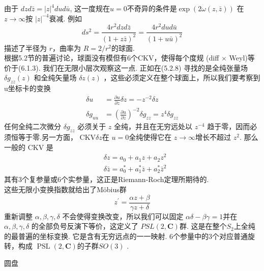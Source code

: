 由于 $d z d \bar{z}=|z|^{4} d u d \bar{u}$, 这一度规在$u=0$不奇异的条件是$\exp (2 \omega(z, \bar{z}))$ 在 $z \rightarrow \infty $按 $|z|^{-4}$衰减. 例如
\begin{equation}
	d s^{2}=\frac{4 r^{2} d z d \bar{z}}{(1+z \bar{z})^{2}}=\frac{4 r^{2} d u d \bar{u}}{(1+u \bar{u})^{2}}
\end{equation}
描述了半径为 $r$，曲率为 $R=2 / r^{2}$的球面.\\
根据5.2节的普遍讨论，球面没有模但有6个CKV，使得每个度规 (diff $\times$ Weyl)等价于(6.1.3). 我们在无限小层次观察这一点. 正如在(5.2.8) 寻找的是全纯张量场$\delta g_{z z}(z)$ 和全纯矢量场 $\delta z(z) $ ，这些必须定义在整个球面上，所以我们要考察到u坐标卡的变换
\begin{equation}
	\begin{aligned}
		\delta u &=\frac{\partial u}{\partial z} \delta z=-z^{-2} \delta z \\
		\delta g_{u u} &=\left(\frac{\partial u}{\partial z}\right)^{-2} \delta g_{z z}=z^{4} \delta g_{z z}
	\end{aligned}
\end{equation}
任何全纯二次微分 $\delta g_{z z}$ 必须关于 $z$ 全纯，并且在无穷远处以 $z^{-4}$ 趋于零，因而必须恒等于零.另一方面， $\mathrm{CKV} \delta z$在 $u=0$全纯使得它在 $z \rightarrow \infty$增长不超过 $z^{2}$. 那么一般的 $\mathrm{CKV}$ 是
\begin{equation}
	\begin{aligned}
		&\delta z=a_{0}+a_{1} z+a_{2} z^{2} \\
		&\delta \bar{z}=a_{0}^{*}+a_{1}^{*} \bar{z}+a_{2}^{*} \bar{z}^{2}
	\end{aligned}
\end{equation}
其有3个复参量或6个实参量，这正是Riemann-Roch定理所期待的.\\
这些无限小变换指数就给出了Möbius群
\begin{equation}
	z^{\prime}=\frac{\alpha z+\beta}{\gamma z+\delta}
\end{equation}
重新调整 $\alpha, \beta, \gamma, \delta $ 不会使得变换改变，所以我们可以固定 $\alpha \delta-\beta \gamma=1$并在 $\alpha, \beta, \gamma, \delta $ 的全部负号反演下等价，这定义了 $P S L(2, \mathbf{C})$群. 这是在整个$S_{2}$上全纯的最普遍的坐标变换. 它是含有无穷远点的一一映射. 6个参量中的3个对应普通旋转，构成 $\operatorname{PSL}(2, \mathbf{C})$的子群$S O(3)$ .\\

\centerline{\Large 圆盘}

